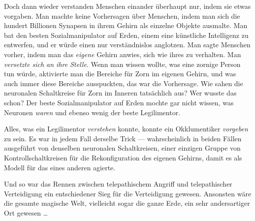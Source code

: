 Doch dann wieder verstanden Menschen einander überhaupt nur, indem sie etwas vorgaben. Man machte keine Vorhersagen über Menschen, indem man sich die hundert Billionen Synapsen in ihrem Gehirn als einzelne Objekte ausmalte. Man bat den besten Sozialmanipulator auf Erden, einem eine künstliche Intelligenz zu entwerfen, und er würde einen nur verständnislos anglotzen. Man sagte Menschen vorher, indem man das \emph{eigene} Gehirn anwies, sich wie ihres zu verhalten. Man \emph{versetzte sich an ihre Stelle}. Wenn man wissen wollte, was eine zornige Person tun würde, aktivierte man die Bereiche für Zorn im eigenen Gehirn, und was auch immer diese Bereiche ausspuckten, das war die Vorhersage. Wie sahen die neuronalen Schaltkreise für Zorn im Inneren tatsächlich aus? Wer wusste das schon? Der beste Sozialmanipulator auf Erden mochte gar nicht wissen, was Neuronen \emph{waren} und ebenso wenig der beste Legilimentor.

Alles, was ein Legilimentor \emph{verstehen} konnte, konnte ein Okklumentiker \emph{vorgeben} zu sein. Es war in jedem Fall derselbe Trick — wahrscheinlich in beiden Fällen ausgeführt von denselben neuronalen Schaltkreisen, einer einzigen Gruppe von Kontrollschaltkreisen für die Rekonfiguration des eigenen Gehirns, damit es als Modell für das eines anderen agierte.

Und so war das Rennen zwischen telepathischem Angriff und telepathischer Verteidigung ein entschiedener Sieg für die Verteidigung gewesen. Ansonsten wäre die gesamte magische Welt, vielleicht sogar die ganze Erde, ein sehr andersartiger Ort gewesen …

